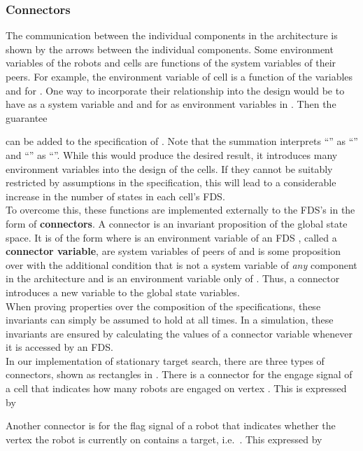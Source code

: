 \subsubsection{Connectors} 

The communication between the individual components in the architecture is shown by the arrows between the individual components. Some environment variables of the robots and cells are functions of the system variables of their peers. For example, the environment variable  of cell  is a function of the variables  and  for . One way to incorporate their relationship into the design would be to have  as a system variable and  and  for  as environment variables in . Then the guarantee

can be added to the specification of . Note that the summation interprets ``'' as ``'' and ``'' as ``''. While this would produce the desired result, it introduces many environment variables into the design of the cells. If they cannot be suitably restricted by assumptions in the specification, this will lead to a considerable increase in the number of states in each cell's FDS.\\

To overcome this, these functions are implemented externally to the FDS's in the form of {\bf connectors}. A connector is an invariant proposition of the global state space. It is of the form  where  is an environment variable of an FDS , called a {\bf connector variable},  are system variables of peers of  and  is some proposition over  with the additional condition that  is not a system variable of \emph{any} component in the architecture and  is an environment variable only of . Thus, a connector introduces a new variable to the global state variables.\\

When proving properties over the composition of the specifications, these invariants can simply be assumed to hold at all times. In a simulation, these invariants are ensured by calculating the values of a connector variable  whenever it is accessed by an FDS.\\

In our implementation of stationary target search, there are three types of connectors, shown as rectangles in . There is a connector for the engage signal  of a cell  that indicates how many robots are engaged on vertex . This is expressed by

Another connector is for the flag signal  of a robot  that indicates whether the vertex  the robot is currently on contains a target, i.e.\ . This expressed by

